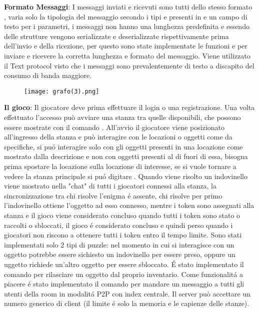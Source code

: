 \documentclass[12pt]{article}
\begin{document}
\textbf{Formato Messaggi}: I messaggi inviati e ricevuti sono tutti dello stesso formato , varia solo la tipologia del messaggio secondo i tipi  e  presenti in  e un campo di testo per i parametri, i messaggi non hanno una lunghezza predefinita e essendo delle strutture vengono serializzate e deserializzate rispettivamente prima dell'invio e della ricezione, per questo sono state implementate le funzioni  e  per inviare e ricevere la corretta lunghezza e formato del messaggio. Viene utilizzato il Text protocol visto che i messaggi sono prevalentemente di testo a discapito del consumo di banda maggiore.

\vspace{0.1in}

\begin{figure}[h]
    \centering
    \texttt{[image: grafo(3).png]}
\end{figure}

\textbf{Il gioco}: Il giocatore deve prima effettuare il login o una registrazione. Una volta effettuato l'accesso può avviare una stanza tra quelle disponibili, che possono essere mostrate con il comando . All'avvio il giocatore viene posizionato all'ingresso della stanza e può interagire con le locazioni o oggetti come da specifiche, si puó interagire solo con gli oggetti presenti in una locazione come mostrato dalla descrizione e non con oggetti presenti al di fuori di essa, bisogna prima spostare la locazione sulla locazione di interesse, se si vuole tornare a vedere la stanza principale si puó digitare . Quando viene risolto un indovinello viene mostrato nella "chat" di tutti i giocatori connessi alla stanza, la sincronizzazione tra chi risolve l'enigma é assente, chi risolve per primo l'indovinello ottiene l'oggetto ad esso connesso, mentre i token sono assegnati alla stanza e il gioco viene considerato concluso quando tutti i token sono stato o raccolti o sbloccati, il gioco é considerato concluso e quindi perso quando i giocatori non riscono a ottenere tutti i token entro il tempo limite. Sono stati implementati solo 2 tipi di puzzle: nel momento in cui si interagisce con un oggetto potrebbe essere sichiesto un indovinello per essere preso, oppure un uggetto richiede un'altro oggetto per essere sbloccato. É stato implementato il comando  per rilasciare un oggetto dal proprio inventario. Come funzionalitá a piacere é stato implementato il comando  per mandare un messaggio a tutti gli utenti della room in modalitá P2P con index centrale. Il server può accettare un numero generico di client (il limite é solo la memoria e le capienze delle stanze).
\end{document}
